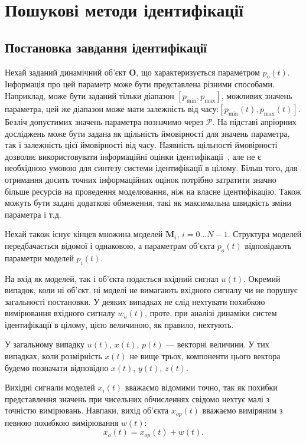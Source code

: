 \chapter{Пошукові методи ідентифікації}

\section{Постановка завдання ідентифікації} %

Нехай заданий динамічний об'єкт
$ \mathbf{O} $, що характеризується параметром
$ p_o (t) $. Інформація про цей параметр може бути представлена
різними способами. Наприклад, може бути заданий тільки
діапазон
$ [p_{\min}, p_{\max}] $, можливих значень параметра, цей же діапазон може
мати залежність від часу:$ [p_{\min} (t), p_{\max} (t)] $. Безліч допустимих
значень параметра позначимо через
$ \mathcal{P} $. На підставі апріорних досліджень може бути задана
як щільність ймовірності для значень параметра, так і
залежність цієї ймовірності від часу. Наявність щільності
ймовірності дозволяє використовувати інформаційні оцінки
ідентифікації~\cite{info_cipkin, atu_asau10}, але не є необхідною умовою
для синтезу системи ідентифікації в цілому. Більш того,
для отримання досить точних інформаційних оцінок потрібно
затратити значно більше ресурсів на проведення моделювання,
ніж на власне ідентифікацію. Також можуть бути задані додаткові
обмеження, такі як максимальна швидкість зміни параметра і т.д.

Нехай також існує кінцев множина моделей \label{atu:d:N}
$ \mathbf{M}_i $,
$ i = 0 \ldots N-1 $. Структура моделей передбачається відомої і
однаковою, а параметрам об'єкта
$ p_o (t) $ відповідають параметри моделей
$ p_{i} (t) $.

На вхід як моделей, так і об'єкта подається вхідний сигнал
\label{atu:d:u}
$ u (t) $. Окремий випадок, коли ні об'єкт, ні моделі не вимагають
вхідного сигналу чи не порушує загальності постановки. У деяких
випадках не слід нехтувати похибкою вимірювання вхідного
сигналу
$ w_u (t) $, проте, при аналізі динаміки систем ідентифікації в
цілому, цією величиною, як правило, нехтують.

У загальному випадку
$u(t)$,
$x(t)$,
$p(t)$ --- векторні величини. У тих випадках, коли розмірність
$x(t)$ не вище трьох, компоненти цього вектора будемо позначати
відповідно
$x(t) $,
$y(t) $,
$z(t) $.

Вихідні сигнали моделей \label{atu:d:x}
$ x_i (t) $ вважаємо відомими точно, так як похибки представлення
значень при чисельних обчисленнях свідомо нехтує малі з
точністю вимірювань. Навпаки, вихід об'єкта
$ x_{op} (t) $ вважаємо виміряним з певною похибкою вимірювання
\label{atu:d:w}
$ w (t) $:
%
\[
  x_o(t) = x_{op}(t) + w(t).
\]

